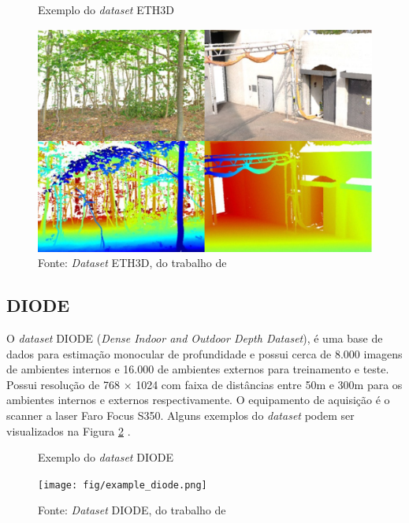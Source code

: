 \begin{figure}[h]
    \centering
    \caption{Exemplo do \textit{dataset} ETH3D}
    \includegraphics[width=.6\textwidth]{fig/eth3d_example.png}
    \caption*{Fonte: \textit{Dataset} ETH3D, do trabalho de }
    \label{fig:eth3dexample}
\end{figure}


\subsection{DIODE}

O \textit{dataset} DIODE (\textit{Dense Indoor and Outdoor Depth Dataset}), é uma base de dados para estimação monocular de profundidade e possui cerca de 8.000 imagens de ambientes internos e 16.000 de ambientes externos para treinamento e teste. Possui resolução de 768 $\times$ 1024 com faixa de distâncias entre 50m e 300m para os ambientes internos e externos respectivamente. O equipamento de aquisição é o scanner a laser Faro Focus S350. Alguns exemplos do \textit{dataset} podem ser visualizados na Figura \ref{exdiode} \cite{diode_dataset}.

\begin{figure}[h]
    \centering
    \caption{Exemplo do \textit{dataset} DIODE}
    \texttt{[image: fig/example\_diode.png]}
    \caption*{Fonte: \textit{Dataset} DIODE, do trabalho de }
    \label{exdiode}
\end{figure}




